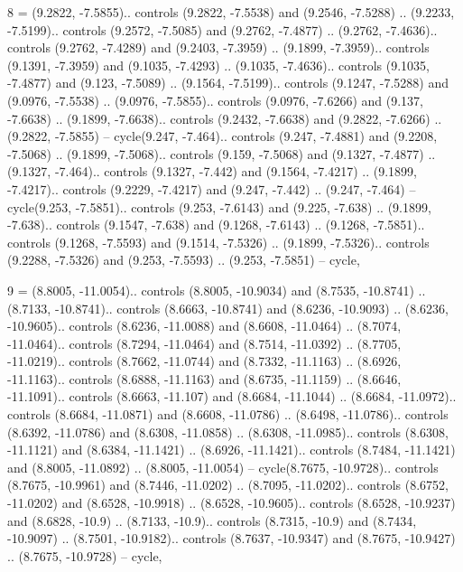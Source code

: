 8 = {(9.2822, -7.5855).. controls (9.2822, -7.5538) and (9.2546, -7.5288) .. (9.2233, -7.5199).. controls (9.2572, -7.5085) and (9.2762, -7.4877) .. (9.2762, -7.4636).. controls (9.2762, -7.4289) and (9.2403, -7.3959) .. (9.1899, -7.3959).. controls (9.1391, -7.3959) and (9.1035, -7.4293) .. (9.1035, -7.4636).. controls (9.1035, -7.4877) and (9.123, -7.5089) .. (9.1564, -7.5199).. controls (9.1247, -7.5288) and (9.0976, -7.5538) .. (9.0976, -7.5855).. controls (9.0976, -7.6266) and (9.137, -7.6638) .. (9.1899, -7.6638).. controls (9.2432, -7.6638) and (9.2822, -7.6266) .. (9.2822, -7.5855) -- cycle(9.247, -7.464).. controls (9.247, -7.4881) and (9.2208, -7.5068) .. (9.1899, -7.5068).. controls (9.159, -7.5068) and (9.1327, -7.4877) .. (9.1327, -7.464).. controls (9.1327, -7.442) and (9.1564, -7.4217) .. (9.1899, -7.4217).. controls (9.2229, -7.4217) and (9.247, -7.442) .. (9.247, -7.464) -- cycle(9.253, -7.5851).. controls (9.253, -7.6143) and (9.225, -7.638) .. (9.1899, -7.638).. controls (9.1547, -7.638) and (9.1268, -7.6143) .. (9.1268, -7.5851).. controls (9.1268, -7.5593) and (9.1514, -7.5326) .. (9.1899, -7.5326).. controls (9.2288, -7.5326) and (9.253, -7.5593) .. (9.253, -7.5851) -- cycle},

9 = {(8.8005, -11.0054).. controls (8.8005, -10.9034) and (8.7535, -10.8741) .. (8.7133, -10.8741).. controls (8.6663, -10.8741) and (8.6236, -10.9093) .. (8.6236, -10.9605).. controls (8.6236, -11.0088) and (8.6608, -11.0464) .. (8.7074, -11.0464).. controls (8.7294, -11.0464) and (8.7514, -11.0392) .. (8.7705, -11.0219).. controls (8.7662, -11.0744) and (8.7332, -11.1163) .. (8.6926, -11.1163).. controls (8.6888, -11.1163) and (8.6735, -11.1159) .. (8.6646, -11.1091).. controls (8.6663, -11.107) and (8.6684, -11.1044) .. (8.6684, -11.0972).. controls (8.6684, -11.0871) and (8.6608, -11.0786) .. (8.6498, -11.0786).. controls (8.6392, -11.0786) and (8.6308, -11.0858) .. (8.6308, -11.0985).. controls (8.6308, -11.1121) and (8.6384, -11.1421) .. (8.6926, -11.1421).. controls (8.7484, -11.1421) and (8.8005, -11.0892) .. (8.8005, -11.0054) -- cycle(8.7675, -10.9728).. controls (8.7675, -10.9961) and (8.7446, -11.0202) .. (8.7095, -11.0202).. controls (8.6752, -11.0202) and (8.6528, -10.9918) .. (8.6528, -10.9605).. controls (8.6528, -10.9237) and (8.6828, -10.9) .. (8.7133, -10.9).. controls (8.7315, -10.9) and (8.7434, -10.9097) .. (8.7501, -10.9182).. controls (8.7637, -10.9347) and (8.7675, -10.9427) .. (8.7675, -10.9728) -- cycle},